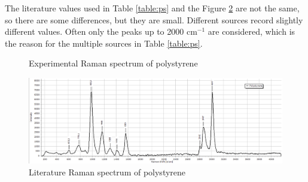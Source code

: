     \bigskip
    
    The literature values used in Table \ref{table:ps} and the Figure \ref{fig:ps_l} are not the same, so there are some differences, but they are small. Different sources record slightly different values. Often only the peaks up to 2000 cm\(^{-1} \) are considered, which is the reason for the multiple sources in Table \ref{table:ps}. 
    

    \newpage

    \begin{figure}[h]
        \centering
        \caption{Experimental Raman spectrum of polystyrene}
        \label{fig:ps_x}
    \end{figure}

    \begin{figure}[h]
        \centering
        \includegraphics[width=\textwidth]{images/lit_raman/PS.png}
        \caption{Literature Raman spectrum of polystyrene \cite{spectrap}}
        \label{fig:ps_l}
    \end{figure}
